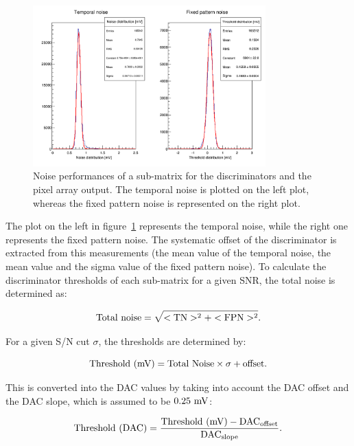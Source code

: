   \begin{figure}[!h]
    \centering
    \includegraphics[width=0.8\textwidth]{Pictures/labTests/noise_A.png}
    \caption{Noise performances of a sub-matrix for the discriminators and the pixel array output. The temporal noise is plotted on the left plot, whereas the fixed pattern noise is represented on the right plot.} 
    \label{fig:TN&FPN}
  \end{figure}

  The plot on the left in figure~\ref{fig:TN&FPN} represents the temporal noise, while the right one represents the fixed pattern noise.
  The systematic offset of the discriminator is extracted from this measurements (the mean value of the temporal noise, the mean value and the sigma value of the fixed pattern noise).
  To calculate the discriminator thresholds of each sub-matrix for a given \gls{SNR}, the total noise is determined as:
  
  \begin{equation}
    \rm{Total~noise} = \sqrt{<\rm{TN}>^2 + <\rm{FPN}>^2}.
  \end{equation}

  For a given S/N cut $\sigma$, the thresholds are determined by:

  \begin{equation}
    \rm{Threshold~(mV)} = \rm{Total~Noise} \times \sigma + \rm{offset}.
  \end{equation}

  This is converted into the DAC values by taking into account the DAC offset and the DAC slope, which is assumed to be $0.25~\rm{mV}$:
  
  \begin{equation}
    \rm{Threshold~(DAC)} = \frac{\rm{Threshold~(mV)} - \rm{DAC}_{\rm{offset}}}{\rm{DAC}_{\rm{slope}}}.
  \end{equation}



